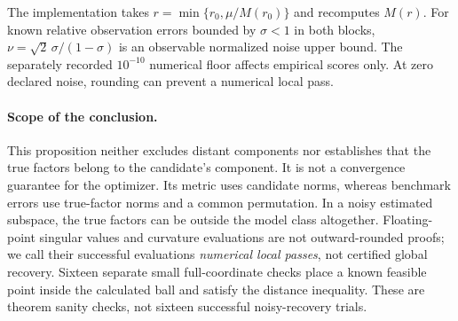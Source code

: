 The implementation takes $r=\min\{r_0,\mu/M(r_0)\}$ and recomputes $M(r)$.
For known relative observation errors bounded by $\sigma<1$ in both
blocks, $\nu=\sqrt2\,\sigma/(1-\sigma)$ is an observable normalized noise
upper bound. The separately recorded $10^{-10}$ numerical floor affects
empirical scores only. At zero declared noise, rounding can prevent a
numerical local pass.

\paragraph{Scope of the conclusion.}
This proposition neither excludes distant components nor establishes that
the true factors belong to the candidate's component. It is not a
convergence guarantee for the optimizer. Its metric uses candidate norms,
whereas benchmark errors use true-factor norms and a common permutation.
In a noisy estimated subspace, the true factors can be outside the model
class altogether. Floating-point singular values and curvature evaluations
are not outward-rounded proofs; we call their successful evaluations
\emph{numerical local passes}, not certified global recovery.
Sixteen separate small full-coordinate checks place a known feasible point
inside the calculated ball and satisfy the distance inequality. These are
theorem sanity checks, not sixteen successful noisy-recovery trials.
